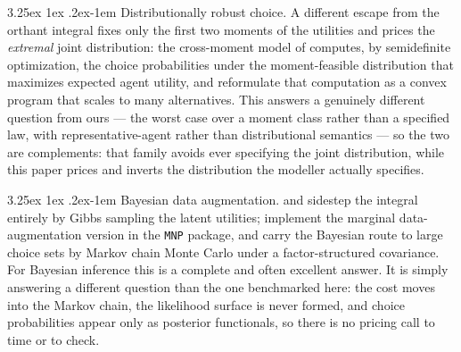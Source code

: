 \documentclass[11pt]{article}
\makeatletter
\renewcommand\paragraph{\@startsection{paragraph}{4}{\z@}%
  {3.25ex \@plus1ex \@minus.2ex}{-1em}%
  {\normalfont\normalsize\itshape}}
\makeatother
\begin{document}
\paragraph{Distributionally robust choice.} A different escape from the
orthant integral fixes only the first two moments of the utilities and
prices the \emph{extremal} joint distribution: the cross-moment model of
\citet{mishra2012} computes, by semidefinite optimization, the choice
probabilities under the moment-feasible distribution that maximizes
expected agent utility, and \citet{ahipasaoglu2019} reformulate that
computation as a convex program that scales to many alternatives. This
answers a genuinely different question from ours --- the worst case over
a moment class rather than a specified law, with representative-agent
rather than distributional semantics --- so the two are complements: that
family avoids ever specifying the joint distribution, while this paper
prices and inverts the distribution the modeller actually specifies.

\paragraph{Bayesian data augmentation.} \citet{albert1993} and
\citet{mcculloch1994} sidestep the integral entirely by Gibbs sampling the latent
utilities; \citet{imai2005} implement the marginal data-augmentation version
in the \texttt{MNP} package, and \citet{loaizamaya2022} carry the Bayesian
route to large choice sets by Markov chain Monte Carlo under a factor-structured covariance. For Bayesian inference
this is a complete and often excellent answer. It is simply answering a different question than the
one benchmarked here: the cost moves into the Markov chain, the likelihood
surface is never formed, and choice probabilities appear only as posterior
functionals, so there is no pricing call to time or to check.
\end{document}
